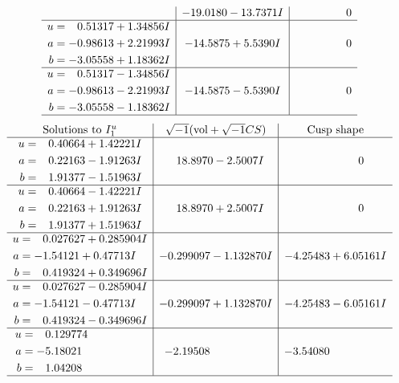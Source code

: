 \documentclass[1p]{elsarticle_modified}
\theoremstyle{definition}
\newcommand{\I}{\sqrt{-1}}
\begin{document}
$$\begin{array}{c|c|c}
 & -19.0180 - 13.7371 I & \phantom{-0.000000 } 0 \\ \hline\begin{aligned}
u &= \phantom{-}0.51317 + 1.34856 I \\
a &= -0.98613 + 2.21993 I \\
b &= -3.05558 + 1.18362 I\end{aligned}
 & -14.5875 + 5.5390 I & \phantom{-0.000000 } 0 \\ \hline\begin{aligned}
u &= \phantom{-}0.51317 - 1.34856 I \\
a &= -0.98613 - 2.21993 I \\
b &= -3.05558 - 1.18362 I\end{aligned}
 & -14.5875 - 5.5390 I & \phantom{-0.000000 } 0\\
 \hline 
 \end{array}$$\newpage$$\begin{array}{c|c|c}  
\text{Solutions to }I^u_{1}& \I (\text{vol} + \sqrt{-1}CS) & \text{Cusp shape}\\
 \hline 
\begin{aligned}
u &= \phantom{-}0.40664 + 1.42221 I \\
a &= \phantom{-}0.22163 - 1.91263 I \\
b &= \phantom{-}1.91377 - 1.51963 I\end{aligned}
 & \phantom{-}18.8970 - 2.5007 I & \phantom{-0.000000 } 0 \\ \hline\begin{aligned}
u &= \phantom{-}0.40664 - 1.42221 I \\
a &= \phantom{-}0.22163 + 1.91263 I \\
b &= \phantom{-}1.91377 + 1.51963 I\end{aligned}
 & \phantom{-}18.8970 + 2.5007 I & \phantom{-0.000000 } 0 \\ \hline\begin{aligned}
u &= \phantom{-}0.027627 + 0.285904 I \\
a &= -1.54121 + 0.47713 I \\
b &= \phantom{-}0.419324 + 0.349696 I\end{aligned}
 & -0.299097 - 1.132870 I & -4.25483 + 6.05161 I \\ \hline\begin{aligned}
u &= \phantom{-}0.027627 - 0.285904 I \\
a &= -1.54121 - 0.47713 I \\
b &= \phantom{-}0.419324 - 0.349696 I\end{aligned}
 & -0.299097 + 1.132870 I & -4.25483 - 6.05161 I \\ \hline\begin{aligned}
u &= \phantom{-}0.129774\phantom{ +0.000000I} \\
a &= -5.18021\phantom{ +0.000000I} \\
b &= \phantom{-}1.04208\phantom{ +0.000000I}\end{aligned}
 & -2.19508\phantom{ +0.000000I} & -3.54080\phantom{ +0.000000I}\\
 \hline 
 \end{array}$$\newpage\newpage\renewcommand{\arraystretch}{1}
\end{document}

